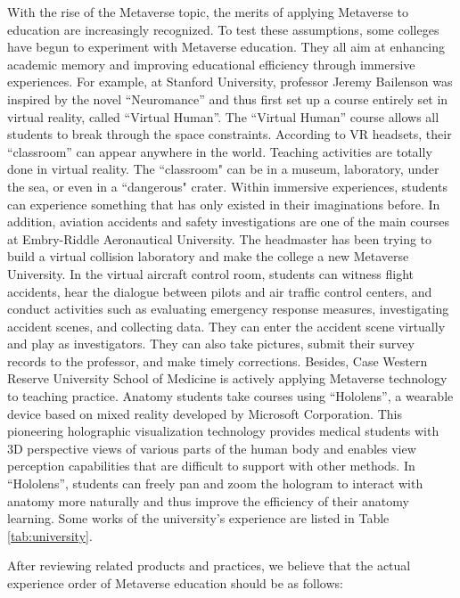 \documentclass[conference]{IEEEtran}
\begin{document}
With the rise of the Metaverse topic, the merits of applying Metaverse to education are increasingly recognized. To test these assumptions, some colleges have begun to experiment with Metaverse education. They all aim at enhancing academic memory and improving educational efficiency through immersive experiences. For example, at Stanford University, professor Jeremy Bailenson was inspired by the novel ``Neuromance'' and thus first set up a course entirely set in virtual reality, called ``Virtual Human''. The ``Virtual Human'' course allows all students to break through the space constraints. According to VR headsets, their ``classroom'' can appear anywhere in the world. Teaching activities are totally done in virtual reality. The ``classroom" can be in a museum, laboratory, under the sea, or even in a ``dangerous" crater. Within immersive experiences, students can experience something that has only existed in their imaginations before. In addition, aviation accidents and safety investigations are one of the main courses at Embry-Riddle Aeronautical University. The headmaster has been trying to build a virtual collision laboratory and make the college a new Metaverse University. In the virtual aircraft control room, students can witness flight accidents, hear the dialogue between pilots and air traffic control centers, and conduct activities such as evaluating emergency response measures, investigating accident scenes, and collecting data. They can enter the accident scene virtually and play as investigators. They can also take pictures, submit their survey records to the professor, and make timely corrections. Besides, Case Western Reserve University School of Medicine is actively applying Metaverse technology to teaching practice. Anatomy students take courses using ``Hololens'', a wearable device based on mixed reality developed by Microsoft Corporation. This pioneering holographic visualization technology provides medical students with 3D perspective views of various parts of the human body and enables view perception capabilities that are difficult to support with other methods. In ``Hololens'', students can freely pan and zoom the hologram to interact with anatomy more naturally and thus improve the efficiency of their anatomy learning. Some works of the university's experience are listed in Table \ref{tab:university}.

After reviewing related products and practices, we believe that the actual experience order of Metaverse education should be as follows:
\end{document}
